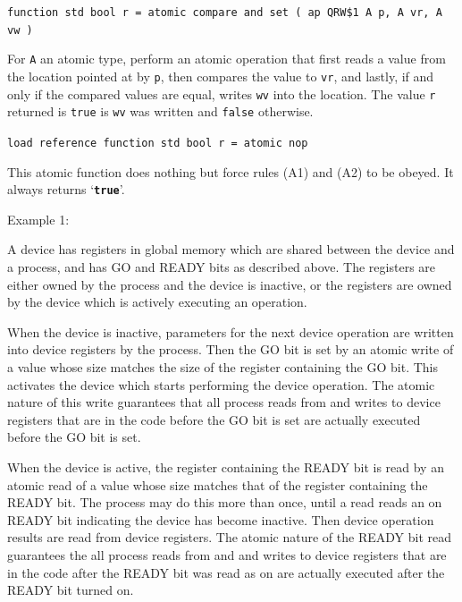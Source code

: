 \documentclass[12pt]{article}
\newcommand{\TT}[1]{{\tt \bfseries #1}}
\newenvironment{indpar}[1][0.3in]%
	{\begin{list}{}%
		     {\setlength{\itemsep}{0in}%
		      \setlength{\topsep}{0in}%
		      \setlength{\parsep}{1ex}%
		      \setlength{\labelwidth}{#1}%
		      \setlength{\leftmargin}{#1}%
		      \addtolength{\leftmargin}{\labelsep}}%
	 \item}%
	{\end{list}}
\begin{document}
{\tt function std bool r =
	atomic compare and set ( ap QRW\$1 A p, A vr, A vw )}
\begin{indpar}
For {\tt A} an atomic type,
perform an atomic operation that first reads a value from the location
pointed at by {\tt p}, then compares the value to {\tt vr}, and lastly,
if and only if the compared values are equal, writes {\tt wv} into the
location.  The value {\tt r} returned is {\tt true} is {\tt wv} was
written and {\tt false} otherwise.
\end{indpar}

{\tt load reference function std bool r = atomic nop}
\begin{indpar}
This atomic function does nothing but force rules (A1) and (A2) to be
obeyed.  It always returns `\TT{true}'.
\end{indpar}

Example 1:
\begin{indpar}
A device has registers in global memory which are shared between the
device and a process, and has GO and READY bits as described above.
The registers are either owned by the process
and the device is inactive, or the registers are owned by the device
which is actively executing an operation.

When the device is inactive, parameters for the next device operation
are written into device registers by the process.  Then
the GO bit is set by an atomic write of a value whose size matches
the size of the register containing the GO bit.
This activates the device which starts performing the device operation.
The atomic nature of this write guarantees that all process reads from
and writes to device registers that are in the code before the GO bit
is set are actually executed before the GO bit is set.

When the device is active, the register containing the
READY bit is read by an atomic read of a value whose size matches
that of the register containing the READY bit.
The process may do this more than once, until a read reads an on READY bit
indicating the device has become inactive.  Then device operation
results are read from device registers.  The atomic nature of the
READY bit read guarantees the all process reads from and
and writes to device registers that are in the code after the READY
bit was read as on are actually executed after the READY bit turned on.
\end{indpar}
\end{document}
